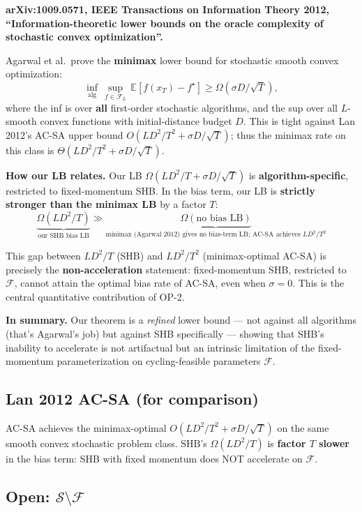 \documentclass[11pt,a4paper]{article}
\theoremstyle{plain}
\theoremstyle{definition}
\theoremstyle{remark}
\newcommand{\E}{\mathbb{E}}
\newcommand{\F}{\mathcal{F}}
\newcommand{\Sset}{\mathcal{S}}
\begin{document}
\textbf{arXiv:1009.0571, IEEE Transactions on Information Theory 2012, ``Information-theoretic lower bounds on the oracle complexity of stochastic convex optimization''.}

Agarwal et al.\ prove the \textbf{minimax} lower bound for stochastic smooth convex optimization:
\[
\inf_{\mathrm{alg}}\,\sup_{f \in \F_{L}}\,\E[f(x_T) - f^\star] \geq \Omega(\sigma D / \sqrt T),
\]
where the inf is over \textbf{all} first-order stochastic algorithms, and the sup over all $L$-smooth convex functions with initial-distance budget $D$. This is tight against Lan 2012's AC-SA upper bound $O(LD^2/T^2 + \sigma D/\sqrt T)$; thus the minimax rate on this class is $\Theta(LD^2/T^2 + \sigma D/\sqrt T)$.

\textbf{How our LB relates.} Our LB $\Omega(LD^2/T + \sigma D/\sqrt T)$ is \textbf{algorithm-specific}, restricted to fixed-momentum SHB. In the bias term, our LB is \textbf{strictly stronger than the minimax LB} by a factor $T$:
\[
\underbrace{\Omega(LD^2/T)}_{\text{our SHB bias LB}} \gg \underbrace{\Omega(\text{no bias LB})}_{\text{minimax (Agarwal 2012) gives no bias-term LB; AC-SA achieves $LD^2/T^2$}}
\]

This gap between $LD^2/T$ (SHB) and $LD^2/T^2$ (minimax-optimal AC-SA) is precisely the \textbf{non-acceleration} statement: fixed-momentum SHB, restricted to $\F$, cannot attain the optimal bias rate of AC-SA, even when $\sigma = 0$. This is the central quantitative contribution of OP-2.

\textbf{In summary.} Our theorem is a \emph{refined} lower bound --- not against all algorithms (that's Agarwal's job) but against SHB specifically --- showing that SHB's inability to accelerate is not artifactual but an intrinsic limitation of the fixed-momentum parameterization on cycling-feasible parameters $\F$.

\subsection{Lan 2012 AC-SA (for comparison)}

AC-SA achieves the minimax-optimal $O(LD^2/T^2 + \sigma D/\sqrt T)$ on the same smooth convex stochastic problem class. SHB's $\Omega(LD^2/T)$ is \textbf{factor $T$ slower} in the bias term: SHB with fixed momentum does NOT accelerate on $\F$.

\subsection{Open: $\Sset\setminus \F$}
\end{document}
